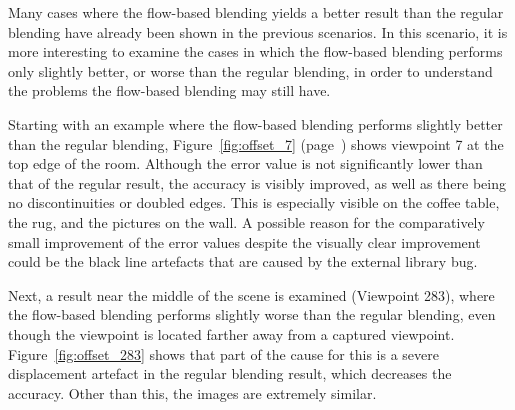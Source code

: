 Many cases where the flow-based blending yields a better result than the regular blending have already been shown in the previous scenarios. In this scenario, it is more interesting to examine the cases in which the flow-based blending performs only slightly better, or worse than the regular blending, in order to understand the problems the flow-based blending may still have.

Starting with an example where the flow-based blending performs slightly better than the regular blending, Figure~\ref{fig:offset_7} (page~\pageref{fig:offset_7}) shows viewpoint 7 at the top edge of the room. Although the error value is not significantly lower than that of the regular result, the accuracy is visibly improved, as well as there being no discontinuities or doubled edges. This is especially visible on the coffee table, the rug, and the pictures on the wall. A possible reason for the comparatively small improvement of the error values despite the visually clear improvement could be the black line artefacts that are caused by the external library bug.

Next, a result near the middle of the scene is examined (Viewpoint 283), where the flow-based blending performs slightly worse than the regular blending, even though the viewpoint is located farther away from a captured viewpoint. Figure~\ref{fig:offset_283} shows that part of the cause for this is a severe displacement artefact in the regular blending result, which decreases the accuracy. Other than this, the images are extremely similar.

